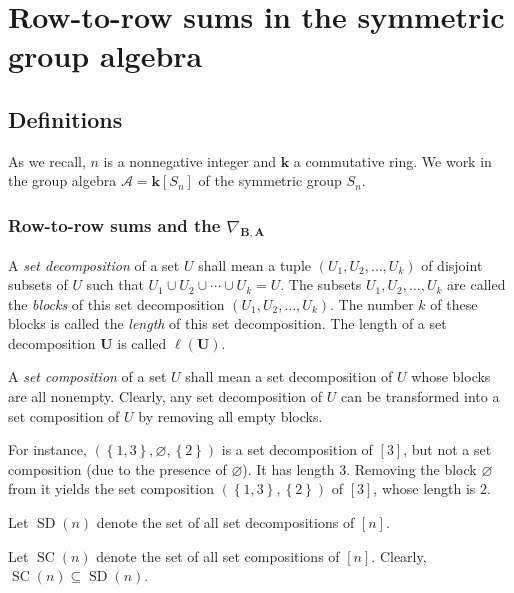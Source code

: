 \documentclass[numbers=enddot,12pt,final,onecolumn,notitlepage]{scrartcl}%
\numberwithin{exer}{subsection}
\theoremstyle{definition}
\begin{document}
\newpage


\section{\label{sec.row-to-row}Row-to-row sums in the symmetric group algebra}

\subsection{Definitions}

As we recall, $n$ is a nonnegative integer and $\mathbf{k}$ a commutative
ring. We work in the group algebra $\mathcal{A}=\mathbf{k}\left[
S_{n}\right]  $ of the symmetric group $S_{n}$.

\subsubsection{Row-to-row sums and the $\nabla_{\mathbf{B},\mathbf{A}}$}

A \emph{set decomposition} of a set $U$ shall mean a tuple $\left(
U_{1},U_{2},\ldots,U_{k}\right)  $ of disjoint subsets of $U$ such that
$U_{1}\cup U_{2}\cup\cdots\cup U_{k}=U$. The subsets $U_{1},U_{2},\ldots
,U_{k}$ are called the \emph{blocks} of this set decomposition $\left(
U_{1},U_{2},\ldots,U_{k}\right)  $. The number $k$ of these blocks is called
the \emph{length} of this set decomposition. The length of a set decomposition
$\mathbf{U}$ is called $\ell\left(  \mathbf{U}\right)  $.

A \emph{set composition} of a set $U$ shall mean a set decomposition of $U$
whose blocks are all nonempty. Clearly, any set decomposition of $U$ can be
transformed into a set composition of $U$ by removing all empty blocks.

For instance, $\left(  \left\{  1,3\right\}  ,\varnothing,\left\{  2\right\}
\right)  $ is a set decomposition of $\left[  3\right]  $, but not a set
composition (due to the presence of $\varnothing$). It has length $3$.
Removing the block $\varnothing$ from it yields the set composition $\left(
\left\{  1,3\right\}  ,\left\{  2\right\}  \right)  $ of $\left[  3\right]  $,
whose length is $2$.

Let $\operatorname*{SD}\left(  n\right)  $ denote the set of all set
decompositions of $\left[  n\right]  $.

Let $\operatorname*{SC}\left(  n\right)  $ denote the set of all set
compositions of $\left[  n\right]  $. Clearly, $\operatorname*{SC}\left(
n\right)  \subseteq\operatorname*{SD}\left(  n\right)  $.
\end{document}
